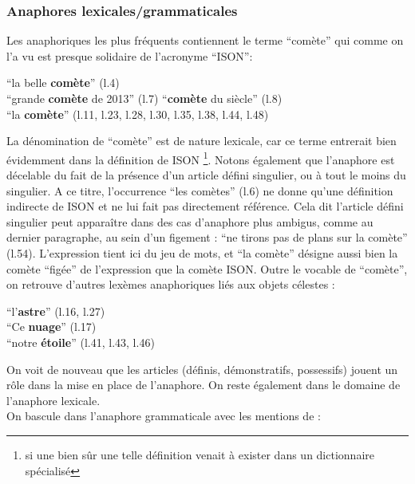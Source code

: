 \documentclass[a4paper,10pt]{article}
\begin{document}
		\subsubsection{Anaphores lexicales/grammaticales} \label{anaphore}
			Les anaphoriques les plus fréquents contiennent le terme ``comète'' qui comme on l'a vu est presque solidaire de l'acronyme ``ISON'':
			\begin{center}
				\footnotesize
				\begin{minipage}{0.7\textwidth}
					``la belle \textbf{comète}'' (l.4)\\
					``grande \textbf{comète} de 2013'' (l.7)
					``\textbf{comète} du siècle'' (l.8)\\
					``la \textbf{comète}'' (l.11, l.23, l.28, l.30, l.35, l.38, l.44, l.48)
				\end{minipage}
			\end{center}
			La dénomination de ``comète'' est de nature lexicale, car ce terme entrerait bien évidemment dans la définition de ISON \footnote{si une bien sûr une telle définition venait à exister dans un dictionnaire spécialisé}. Notons également que l'anaphore est décelable du fait de la présence d'un article défini singulier, ou à tout le moins du singulier. A ce titre, l'occurrence ``les comètes'' (l.6) ne donne qu'une définition indirecte de ISON et ne lui fait pas directement référence. Cela dit l'article défini singulier peut apparaître dans des cas d'anaphore plus ambigus, comme au dernier paragraphe, au sein d'un figement : ``ne tirons pas de plans sur la comète'' (l.54). L'expression tient ici du jeu de mots, et ``la comète'' désigne aussi bien la comète ``figée'' de l'expression  que la comète ISON. Outre le vocable de ``comète'', on retrouve d'autres lexèmes anaphoriques liés aux objets célestes :
			\begin{center}
				\footnotesize
				\begin{minipage}{0.7\textwidth}
					``l'\textbf{astre}'' (l.16, l.27) \\
					``Ce \textbf{nuage}'' (l.17) \\
					``notre \textbf{étoile}'' (l.41, l.43, l.46)
				\end{minipage}
			\end{center}
			On voit de nouveau que les articles (définis, démonstratifs, possessifs) jouent un rôle dans la mise en place de l'anaphore. On reste également dans le domaine de l'anaphore lexicale.\\
			On bascule dans l'anaphore grammaticale avec les mentions de :
\end{document}
